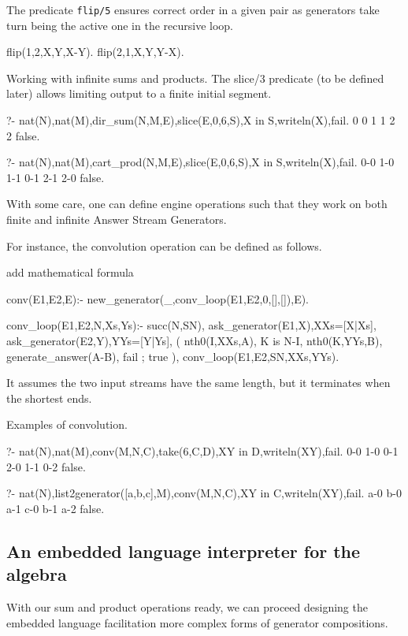 \documentclass{new_tlp}
\begin{document}
The predicate {\tt flip/5} ensures correct order in a given pair
as  generators take turn being the active one in the recursive loop. 
\begin{code} 
flip(1,2,X,Y,X-Y).
flip(2,1,X,Y,Y-X).
\end{code}

\BX
Working with infinite sums and products. The slice/3 predicate (to be defined later) allows limiting output to a finite initial segment.
\begin{codex}
?- nat(N),nat(M),dir_sum(N,M,E),slice(E,0,6,S),X in S,writeln(X),fail.
0
0
1
1
2
2
false.

?- nat(N),nat(M),cart_prod(N,M,E),slice(E,0,6,S),X in S,writeln(X),fail.
0-0
1-0
1-1
0-1
2-1
2-0
false.
\end{codex}
\EX


With some care, one can define engine operations such that they work on both
finite and infinite Answer Stream Generators.

For instance, the convolution operation can be defined as follows.


{\Large add mathematical formula}

\begin{code}

conv(E1,E2,E):-
  new_generator(_,conv_loop(E1,E2,0,[],[]),E).

conv_loop(E1,E2,N,Xs,Ys):-
  succ(N,SN),
  ask_generator(E1,X),XXs=[X|Xs],
  ask_generator(E2,Y),YYs=[Y|Ys],
  ( nth0(I,XXs,A),
    K is N-I,
    nth0(K,YYs,B),
    generate_answer(A-B),
    fail
  ; true  
  ),
  conv_loop(E1,E2,SN,XXs,YYs).
\end{code}

It assumes the two input streams have the same length, but it terminates
when the shortest ends. 

\BX
Examples of convolution.
\begin{codex}
?- nat(N),nat(M),conv(M,N,C),take(6,C,D),XY in D,writeln(XY),fail.
0-0
1-0
0-1
2-0
1-1
0-2
false.

?- nat(N),list2generator([a,b,c],M),conv(M,N,C),XY in C,writeln(XY),fail.
a-0
b-0
a-1
c-0
b-1
a-2
false.
\end{codex}
\EX

\subsection{An embedded language interpreter for the algebra}

With our sum and product operations ready, we can proceed designing the embedded language
facilitation more complex forms of generator compositions.
\end{document}
